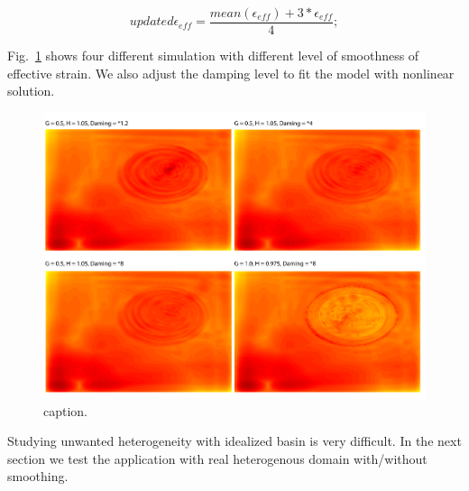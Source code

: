 \begin{equation}
updated \epsilon_{eff} = \frac{mean(\epsilon_{eff})+ 3*\epsilon_{eff}}{4};
\end{equation}
 
Fig.~\ref{fig:plane_pgv_smoothed} shows four different simulation with different level of smoothness of effective strain. We also adjust the damping level to fit the model with nonlinear solution. 

\begin{figure}[H]
    \centering
    \includegraphics[width=\textwidth]{figures/pdf/plane_pgv_smoothed.pdf}
    \caption{caption. }
    \label{fig:plane_pgv_smoothed}
\end{figure}


Studying unwanted heterogeneity with idealized basin is very difficult. In the next section we test the application with real heterogenous domain with/without smoothing. 